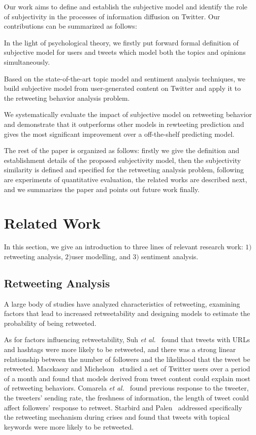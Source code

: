 \documentclass{acm_proc_article-sp}
\begin{document}
Our work aims to define and establish the subjective model and identify the role of subjectivity in the processes of information diffusion on Twitter. Our contributions can be summarized as follows:
\begin{itemize*}
\item In the light of psychological theory, we firstly put forward formal definition of subjective model for users and tweets which model both the topics and opinions simultaneously.
\item Based on the state-of-the-art topic model and sentiment analysis techniques, we build subjective model from user-generated content on Twitter and apply it to the retweeting behavior analysis problem.
\item We systematically evaluate the impact of subjective model on retweeting behavior and demonstrate that it outperforms other models in rewteeting prediction and gives the most significant improvement over a off-the-shelf predicting model. 
\end{itemize*}
The rest of the paper is organized as follows: firstly we give the definition and establishment details of the proposed subjectivity model, then the subjectivity similarity is defined and specified for the retweeting analysis problem, following are experiments of quantitative evaluation, the related works are described next, and we summarizes the paper and points out future work finally.

\section{Related Work}
\label{relatedwork}
In this section, we give an introduction to three lines of relevant research work: $ 1) $ retweeting analysis, $ 2) $user modelling, and $  3)$ sentiment analysis. 
\subsection{Retweeting Analysis}
A large body of studies have analyzed characteristics of retweeting, examining factors that lead to increased retweetability and designing models to estimate the probability of being retweeted. 

As for factors influencing retweetability, Suh \emph{et al.}~\cite{suh2010want} found that tweets with URLs and hashtags were more likely to be retweeted, and there was a strong linear relationship between the number of followers and the likelihood that the tweet be retweeted. 
Macskassy and Michelson~\cite{macskassy2011people} studied a set of Twitter users over a period of a month and found that models derived from tweet content could explain most of retweeting behaviors.
Comarela \emph{et al.}~\cite{comarela2012understanding} found previous response to the tweeter, the tweeters’ sending rate, the freshness of information, the length of tweet could affect followers’ response to retweet. 
Starbird and Palen~\cite{starbird2012will} addressed specifically the retweeting mechanism during crises and found that tweets with topical keywords were more likely to be retweeted. 
\end{document}
